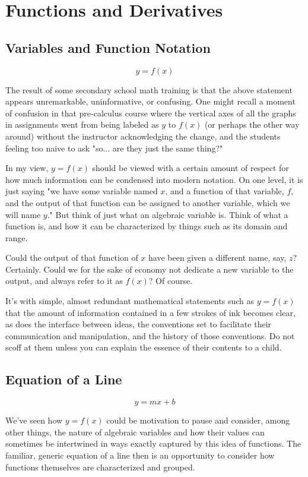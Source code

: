 \documentclass[a4paper]{article}
\begin{document}
\section{Functions and Derivatives}

\subsection{Variables and Function Notation}

$$ y = f(x) $$

The result of some secondary school math training is that the above statement appears unremarkable, uninformative, or confusing. One might recall a moment of confusion in that pre-calculus course where the vertical axes of all the graphs in assignments went from being labeled as $y$ to $f(x)$ (or perhaps the other way around) without the instructor acknowledging the change, and the students feeling too naive to ask "so... are they just the same thing?"

In my view, $y=f(x)$ should be viewed with a certain amount of respect for how much information can be condensed into modern notation. On one level, it is just saying "we have some variable named $x$, and a function of that variable, $f$, and the output of that function can be assigned to another variable, which we will name $y$." But think of just what an algebraic variable is. Think of what a function is, and how it can be characterized by things such as its domain and range.

Could the output of that function of $x$ have been given a different name, say, $z$? Certainly. Could we for the sake of economy not dedicate a new variable to the output, and always refer to it as $f(x)$? Of course.

It's with simple, almost redundant mathematical statements such as $y=f(x)$ that the amount of information contained in a few strokes of ink becomes clear, as does the interface between ideas, the conventions set to facilitate their communication and manipulation, and the history of those conventions. Do not scoff at them unless you can explain the essence of their contents to a child.

\subsection{Equation of a Line}

$$ y = mx + b $$

We've seen how $y=f(x)$ could be motivation to pause and consider, among other things, the nature of algebraic variables and how their values can sometimes be intertwined in ways exactly captured by this idea of functions. The familiar, generic equation of a line then is an opportunity to consider how functions themselves are characterized and grouped.
\end{document}
